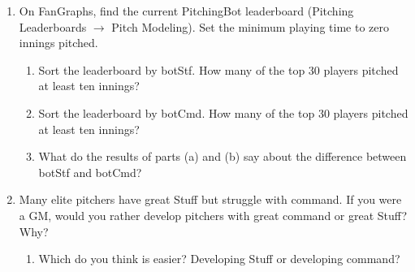 \documentclass{article}
\begin{document}
    \begin{enumerate}
      \item On FanGraphs, find the current PitchingBot leaderboard (Pitching Leaderboards $\rightarrow$ Pitch Modeling). Set the minimum playing time to zero innings pitched.
      \begin{enumerate}
        \item Sort the leaderboard by botStf. How many of the top 30 players pitched at least ten innings?
        \item Sort the leaderboard by botCmd. How many of the top 30 players pitched at least ten innings?
        \item What do the results of parts (a) and (b) say about the difference between botStf and botCmd?
      \end{enumerate}
      \item Many elite pitchers have great Stuff but struggle with command. If you were a GM, would you rather develop pitchers with great command or great Stuff? Why?
      \begin{enumerate}
        \item Which do you think is easier? Developing Stuff or developing command?
      \end{enumerate}
    \end{enumerate}
\end{document}
